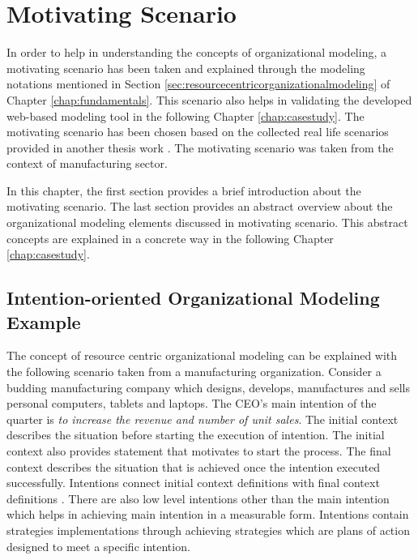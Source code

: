 \chapter{Motivating Scenario}
\label{chap:motivatingScenario}
In order to help in understanding the concepts of organizational modeling, a motivating scenario has been taken and explained through the modeling notations mentioned in Section \ref{sec:resourcecentricorganizationalmodeling} of Chapter \ref{chap:fundamentals}. This scenario also helps in validating the developed web-based modeling tool in the following Chapter \ref{chap:casestudy}. The motivating scenario has been chosen based on the collected real life scenarios provided in another thesis work \cite{Sierr2015}. The motivating scenario was taken from the context of manufacturing sector. 

In this chapter, the first section provides a brief introduction about the motivating scenario. The last section provides an abstract overview about the organizational modeling elements discussed in motivating scenario. This abstract concepts are explained in a concrete way in the following Chapter \ref{chap:casestudy}.

\section{Intention-oriented Organizational Modeling Example}
\label{sec:scenario}
 The concept of resource centric organizational modeling can be explained with the following scenario taken from a manufacturing organization. Consider a budding manufacturing company which designs, develops, manufactures and sells personal computers, tablets and laptops. The CEO's main intention of the quarter is \textit{to increase the revenue and number of unit sales}. The initial context describes the situation before starting the execution of intention. The initial context also provides statement that motivates to start the process. The final context describes the situation that is achieved once the intention executed successfully. Intentions connect initial context definitions with final context definitions \cite{Sungur2014a}. There are also low level intentions other than the main intention which helps in achieving main intention in a measurable form. Intentions contain strategies implementations through achieving strategies which are plans of action designed to meet a specific intention. 
 
